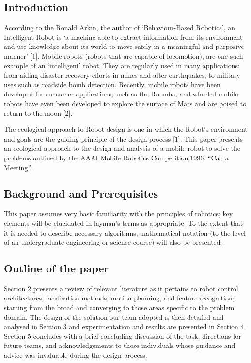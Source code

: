 \documentclass{article}
\begin{document}
	\begin{multicols}{2}
    \section{Introduction}
	According to the Ronald Arkin, the author of ‘Behaviour-Based Robotics’, an Intelligent Robot is ‘a machine able to extract information from its environment and use knowledge about its world to move safely in a meaningful and purposive manner’ [1]. Mobile robots (robots that are capable of locomotion), are one such example of an ‘intelligent’ robot. They are regularly used in many applications: from aiding disaster recovery efforts in mines and after earthquakes, to military uses such as roadside bomb detection. Recently, mobile robots have been developed for consumer applications, such as the Roomba, and wheeled mobile robots have even been developed to explore the surface of Mars and are poised to return to the moon [2].

	The ecological approach to Robot design is one in which the Robot’s environment and goals are the guiding principle of the design process [1]. This paper presents an ecological approach to the design and analysis of a mobile robot to solve the problems outlined by the AAAI Mobile Robotics Competition,1996: “Call a Meeting”.

	\subsection{Background and Prerequisites}
	This paper assumes very basic familiarity with the principles of robotics; key elements will be elucidated in layman’s terms as appropriate. To the extent that it is needed to describe necessary algorithms, mathematical notation (to the level of an undergraduate engineering or science course) will also be presented.

	\subsection{Outline of the paper}
	Section 2 presents a review of relevant literature as it pertains to robot control architectures, localisation methods, motion planning, and feature recognition; starting from the broad and converging to those areas specific to the problem domain. The design of the solution our team adopted is then detailed and analysed in Section 3 and experimentation and results are presented in Section 4. Section 5 concludes with a brief concluding discussion of the task, directions for future teams, and acknowledgements to those individuals whose guidance and advice was invaluable during the design process.
	\end{multicols}
\end{document}
